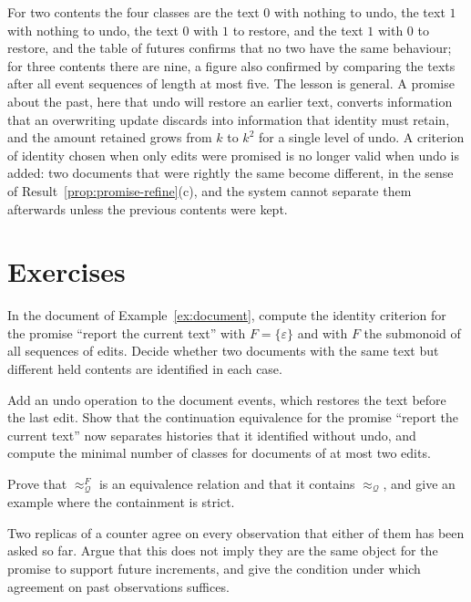 For two contents the four classes are the text $0$ with nothing to undo, the text $1$ with nothing to undo, the text $0$ with $1$ to restore, and the text $1$ with $0$ to restore, and the table of futures confirms that no two have the same behaviour; for three contents there are nine, a figure also confirmed by comparing the texts after all event sequences of length at most five. The lesson is general. A promise about the past, here that undo will restore an earlier text, converts information that an overwriting update discards into information that identity must retain, and the amount retained grows from $k$ to $k^{2}$ for a single level of undo. A criterion of identity chosen when only edits were promised is no longer valid when undo is added: two documents that were rightly the same become different, in the sense of Result~\ref{prop:promise-refine}(c), and the system cannot separate them afterwards unless the previous contents were kept.

\section*{Exercises}

\begin{exercise}
In the document of Example~\ref{ex:document}, compute the identity criterion for the promise ``report the current text'' with $F=\{\varepsilon\}$ and with $F$ the submonoid of all sequences of edits. Decide whether two documents with the same text but different held contents are identified in each case.
\end{exercise}

\begin{exercise}
Add an undo operation to the document events, which restores the text before the last edit. Show that the continuation equivalence for the promise ``report the current text'' now separates histories that it identified without undo, and compute the minimal number of classes for documents of at most two edits.
\end{exercise}

\begin{exercise}
Prove that $\approx^{F}_{\mathcal Q}$ is an equivalence relation and that it contains $\approx_{\mathcal Q}$, and give an example where the containment is strict.
\end{exercise}

\begin{exercise}
Two replicas of a counter agree on every observation that either of them has been asked so far. Argue that this does not imply they are the same object for the promise to support future increments, and give the condition under which agreement on past observations suffices.
\end{exercise}

